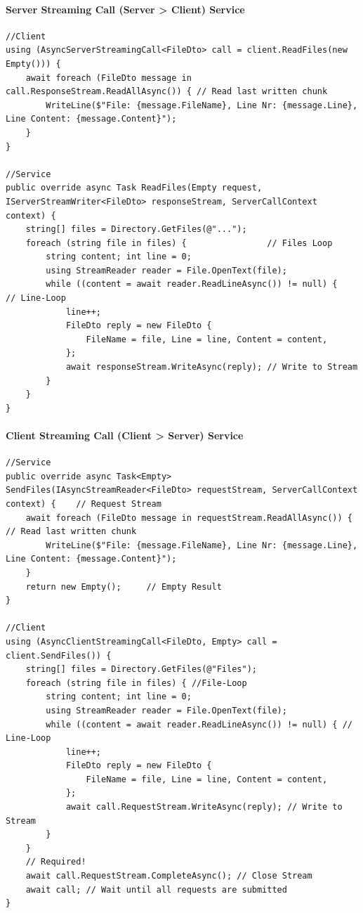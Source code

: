 \documentclass[
a4paper,
oneside,
10pt,
fleqn,
headsepline,
toc=listofnumbered, 
bibliography=totocnumbered]{scrartcl}
\begin{document}
\paragraph{Server Streaming Call (Server > Client) Service}
\begin{lstlisting}
//Client
using (AsyncServerStreamingCall<FileDto> call = client.ReadFiles(new Empty())) {
    await foreach (FileDto message in call.ResponseStream.ReadAllAsync()) { // Read last written chunk
        WriteLine($"File: {message.FileName}, Line Nr: {message.Line}, Line Content: {message.Content}");
    }
}

//Service
public override async Task ReadFiles(Empty request, IServerStreamWriter<FileDto> responseStream, ServerCallContext context) {
    string[] files = Directory.GetFiles(@"...");
    foreach (string file in files) {                // Files Loop
        string content; int line = 0;
        using StreamReader reader = File.OpenText(file);
        while ((content = await reader.ReadLineAsync()) != null) {      // Line-Loop
            line++;
            FileDto reply = new FileDto {
                FileName = file, Line = line, Content = content,
            };
            await responseStream.WriteAsync(reply); // Write to Stream
        }
    }
}
\end{lstlisting}

\paragraph{Client Streaming Call (Client > Server) Service}
\begin{lstlisting}
//Service
public override async Task<Empty> SendFiles(IAsyncStreamReader<FileDto> requestStream, ServerCallContext context) {    // Request Stream
    await foreach (FileDto message in requestStream.ReadAllAsync()) {   // Read last written chunk
        WriteLine($"File: {message.FileName}, Line Nr: {message.Line}, Line Content: {message.Content}");
    }
    return new Empty();     // Empty Result
}

//Client
using (AsyncClientStreamingCall<FileDto, Empty> call = client.SendFiles()) {
    string[] files = Directory.GetFiles(@"Files");
    foreach (string file in files) { //File-Loop
        string content; int line = 0;
        using StreamReader reader = File.OpenText(file);
        while ((content = await reader.ReadLineAsync()) != null) { // Line-Loop
            line++;
            FileDto reply = new FileDto {
                FileName = file, Line = line, Content = content,
            };
            await call.RequestStream.WriteAsync(reply); // Write to Stream
        }
    }
    // Required!
    await call.RequestStream.CompleteAsync(); // Close Stream
    await call; // Wait until all requests are submitted
}
\end{lstlisting}
\end{document}
